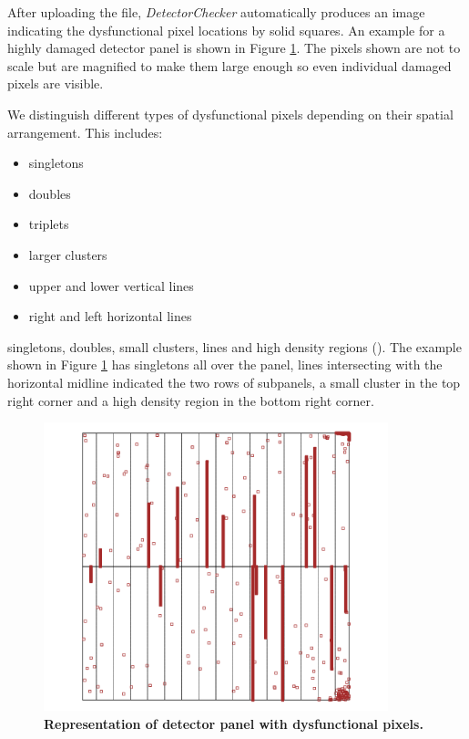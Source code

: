 \documentclass[11pt,a4paper,twosided]{article}
\newcommand{\DetectorChecker}{\emph{DetectorChecker}\xspace}
\begin{document}
After uploading the file, \DetectorChecker automatically produces an image indicating the dysfunctional pixel locations 
by solid squares. An example for a highly damaged detector panel is shown in Figure \ref{damagedPixels}.
The pixels shown are not to scale but are magnified to make them large enough so even individual
damaged pixels are visible.

We distinguish different types of dysfunctional pixels depending on their spatial arrangement. 
This includes:
\begin{itemize}
\item singletons
\item doubles
\item triplets
\item larger clusters
\item upper and lower vertical lines
\item right and left horizontal lines
\end{itemize}

 singletons, doubles, small clusters, lines and high density regions (\cite{brettschneider2014crism}). 
The example shown in Figure \ref{damagedPixels} has singletons all over the panel, lines intersecting
with the horizontal midline indicated the two rows of subpanels, a small cluster in the top right corner
and a high density region in the bottom right corner. 

\begin{figure}[htbp]
\begin{center}
\includegraphics[width=10cm]{damagedPixels.png}
\caption
{
{\bfseries Representation of detector panel with dysfunctional pixels.}
}
\label{damagedPixels}
\end{center}
\end{figure}
\end{document}
